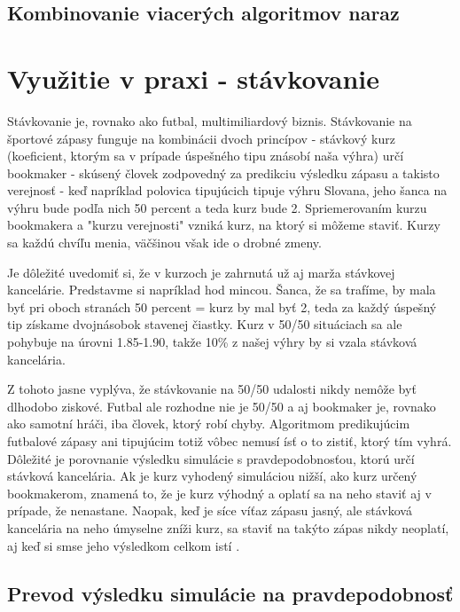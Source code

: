 \documentclass[10pt,twoside,slovak,a4paper]{article}
\begin{document}
\subsection{Kombinovanie viacerých algoritmov naraz}

\section{Využitie v praxi - stávkovanie}

Stávkovanie je, rovnako ako futbal, multimiliardový biznis. Stávkovanie na športové zápasy funguje na kombinácii dvoch princípov - stávkový kurz (koeficient, ktorým sa v prípade úspešného tipu znásobí naša výhra) určí bookmaker - skúsený človek zodpovedný za predikciu výsledku zápasu a takisto verejnosť - keď napríklad polovica tipujúcich tipuje výhru Slovana, jeho šanca na výhru bude podľa nich 50 percent a teda kurz bude 2. Spriemerovaním kurzu bookmakera a "kurzu verejnosti" vzniká kurz, na ktorý si môžeme staviť. Kurzy sa každú chvíľu menia, väčšinou však ide o drobné zmeny.

Je dôležité uvedomiť si, že v kurzoch je zahrnutá už aj marža stávkovej kancelárie. Predstavme si napríklad hod mincou. Šanca, že sa trafíme, by mala byť pri oboch stranách 50 percent = kurz by mal byť 2, teda za každý úspešný tip získame dvojnásobok stavenej čiastky. Kurz v 50/50 situáciach sa ale pohybuje na úrovni 1.85-1.90, takže 10\% z našej výhry by si vzala stávková kancelária.

Z tohoto jasne vyplýva, že stávkovanie na 50/50 udalosti nikdy nemôže byť dlhodobo ziskové. Futbal ale rozhodne nie je 50/50 a aj bookmaker je, rovnako ako samotní hráči, iba človek, ktorý robí chyby. Algoritmom predikujúcim futbalové zápasy ani tipujúcim totiž vôbec nemusí ísť o to zistiť, ktorý tím vyhrá. Dôležité je porovnanie výsledku simulácie s pravdepodobnosťou, ktorú určí stávková kancelária. Ak je kurz vyhodený simuláciou nižší, ako kurz určený bookmakerom, znamená to, že je kurz výhodný a oplatí sa na neho staviť aj v prípade, že nenastane. Naopak, keď je síce víťaz zápasu jasný, ale stávková kancelária na neho úmyselne zníži kurz, sa staviť na takýto zápas nikdy neoplatí, aj keď si smse jeho výsledkom celkom istí \cite{ANGELINI2019712}.

\subsection{Prevod výsledku simulácie na pravdepodobnosť}
\end{document}

